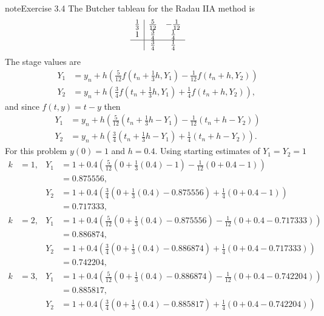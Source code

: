 \documentclass[letterpaper,10pt,english]{jupyterBook}
\begin{document}
\begin{sphinxadmonition}{note}{Exercise 3.4}
\sphinxAtStartPar
The Butcher tableau for the Radau IIA method is
\begin{align*}
    \begin{array}{c|cc}
        \frac{1}{3} & \frac{5}{12} & -\frac{1}{12} \\
        1 & \frac{3}{4} & \frac{1}{4} \\
        \hline
        & \frac{3}{4} & \frac{1}{4}
    \end{array}
\end{align*}
\sphinxAtStartPar
The stage values are
\begin{align*}
    Y_1 &= y_n + h (\tfrac{5}{12} f(t_n + \tfrac{1}{3} h, Y_1) - \tfrac{1}{12} f(t_n + h, Y_2)) \\
    Y_2 &= y_n + h (\tfrac{3}{4} f(t_n + \tfrac{1}{3} h, Y_1) + \tfrac{1}{4} f(t_n + h, Y_2)),
\end{align*}
\sphinxAtStartPar
and since \(f(t,y) = t - y \) then
\begin{align*}
    Y_1 &= y_n + h (\tfrac{5}{12} (t_n + \tfrac{1}{3} h - Y_1) - \tfrac{1}{12} (t_n + h - Y_2)) \\
    Y_2 &= y_n + h (\tfrac{3}{4} (t_n + \tfrac{1}{3} h - Y_1) + \tfrac{1}{4} (t_n + h - Y_2)).
\end{align*}
\sphinxAtStartPar
For this problem \(y(0) = 1\) and \(h = 0.4\). Using starting estimates of \(Y_1 = Y_2 = 1\)
\begin{align*}
    k &= 1, & Y_1 &= 1 + 0.4 (\tfrac{5}{12} (0 + \tfrac{1}{3} (0.4) - 1) - \tfrac{1}{12} (0 + 0.4 - 1)) \\
    && &= 0.875556, \\
    && Y_2 &= 1 + 0.4 (\tfrac{3}{4} (0 + \tfrac{1}{3} (0.4) - 0.875556) + \tfrac{1}{4} (0 + 0.4 - 1)) \\
    && &= 0.717333, \\
    k &= 2, & Y_1 &= 1 + 0.4 (\tfrac{5}{12}( 0 + \tfrac{1}{3} (0.4) - 0.875556) - \tfrac{1}{12} (0 + 0.4 - 0.717333)) \\
    && &= 0.886874, \\
    && Y_2 &= 1 + 0.4 (\tfrac{3}{4} (0 + \tfrac{1}{3} (0.4) - 0.886874) + \tfrac{1}{4} (0 + 0.4 - 0.717333)) \\
    && &= 0.742204, \\
    k &= 3, & Y_1 &= 1 + 0.4 (\tfrac{5}{12} (0 + \tfrac{1}{3} (0.4) - 0.886874) - \tfrac{1}{12} (0 + 0.4 - 0.742204)) \\
    && &= 0.885817, \\
    && Y_2 &= 1 + 0.4 (\frac{3}{4} (0 + \tfrac{1}{3} (0.4) - 0.885817) + \tfrac{1}{4} (0 + 0.4 - 0.742204)) \\

\end{align*}
\end{sphinxadmonition}
\end{document}
